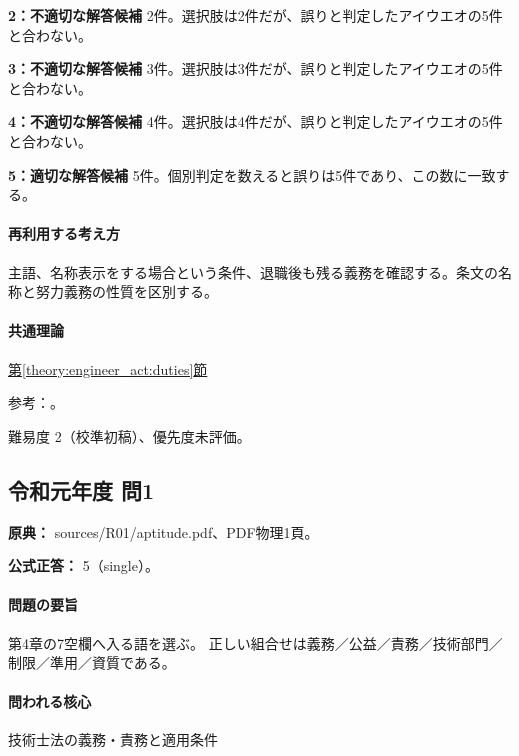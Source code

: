 \noindent\textbf{2：不適切な解答候補} 2件。選択肢は2件だが、誤りと判定したアイウエオの5件と合わない。\par

\noindent\textbf{3：不適切な解答候補} 3件。選択肢は3件だが、誤りと判定したアイウエオの5件と合わない。\par

\noindent\textbf{4：不適切な解答候補} 4件。選択肢は4件だが、誤りと判定したアイウエオの5件と合わない。\par

\noindent\textbf{5：適切な解答候補} 5件。個別判定を数えると誤りは5件であり、この数に一致する。\par

\paragraph{再利用する考え方} 主語、名称表示をする場合という条件、退職後も残る義務を確認する。条文の名称と努力義務の性質を区別する。

\paragraph{共通理論} \hyperref[theory:engineer_act:duties]{第\ref*{theory:engineer_act:duties}節}

\par 参考：\cite{engineer_act_current}。

\par 難易度 2（校準初稿）、優先度未評価。

\subsection{令和元年度 問1}
\label{q:r01-reg-apt-01}

\noindent\textbf{原典：} sources/R01/aptitude.pdf、PDF物理1頁。

\textbf{公式正答：} 5（single）。

\paragraph{問題の要旨} 第4章の7空欄へ入る語を選ぶ。 正しい組合せは義務／公益／責務／技術部門／制限／準用／資質である。

\paragraph{問われる核心} 技術士法の義務・責務と適用条件

